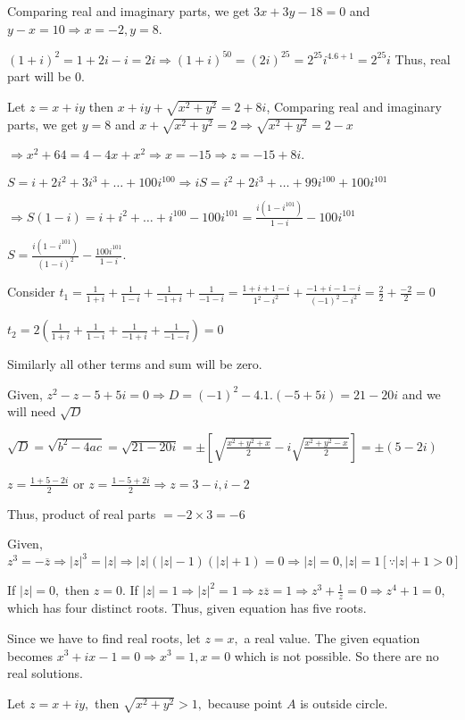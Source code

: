   Comparing real and imaginary parts, we get $3x + 3y - 18 = 0$ and $y - x = 10 \Rightarrow x = -2, y = 8$.
\item $(1 + i)^2 = 1 + 2i - i = 2i\Rightarrow (1 + i)^{50} = (2i)^{25} = 2^{25}i^{4.6 + 1} = 2^{25}i$ Thus,
  real part will be $0$.
\item Let $z = x + iy$ then $x + iy + \sqrt{x^2 + y^2} = 2 + 8i$, Comparing real and imaginary parts, we get
  $y = 8$ and $x + \sqrt{x^2 + y^2} = 2 \Rightarrow \sqrt{x^2 + y^2} = 2 - x$

  $\Rightarrow x^2 + 64 = 4 - 4x + x^2 \Rightarrow x = -15\Rightarrow z = -15 + 8i$.
\item $S = i + 2i^2 + 3i^3 +\ldots + 100i^{100}\Rightarrow iS = i^2 + 2i^3 + \ldots + 99i^{100} + 100i^{101}$

  $\Rightarrow S(1- i) = i + i^2 + \ldots + i^{100} - 100i^{101} = \frac{i(1 - i^{101})}{1 - i} - 100i^{101}$

  $S = \frac{i(1 - i^{101})}{(1- i)^2} - \frac{100i^{101}}{1 - i}$.
\item Consider $t_1 = \frac{1}{1 + i} + \frac{1}{1 - i} + \frac{1}{-1 + i} + \frac{1}{-1 - i} = \frac{1 + i
  + 1 - i}{1^2 - i^2} + \frac{-1 + i - 1 - i}{(-1)^2 - i^2} = \frac{2}{2} + \frac{-2}{2} = 0$

  $t_2 = 2\left(\frac{1}{1 + i} + \frac{1}{1 - i} + \frac{1}{-1 + i} + \frac{1}{-1 - i}\right) = 0$

  Similarly all other terms and sum will be zero.
\item Given, $z^2 - z - 5 + 5i = 0 \Rightarrow D = (-1)^2 - 4.1.(-5 + 5i) = 21 - 20i$ and we will need
  $\sqrt{D}$

  $\sqrt{D} = \sqrt{b^2 - 4ac} = \sqrt{21 - 20i} = \pm \left[\sqrt{\frac{x^2 + y^2 + x}{2}} -
  i\sqrt{\frac{x^2 + y^2 - x}{2}}\right] = \pm(5 - 2i)$

  $z = \frac{1 + 5 - 2i}{2}$ or $z = \frac{1 - 5 + 2i}{2}\Rightarrow z = 3 - i, i - 2$

  Thus, product of real parts $= -2\times 3 = -6$
\item Given, $z^3 = -\overline{z}\Rightarrow |z|^3 = |z|\Rightarrow |z|(|z| - 1)(|z| + 1) = 0 \Rightarrow
  |z| = 0, |z| = 1 [\because |z| + 1 > 0]$

  If $|z| = 0,$ then $z = 0.$ If $|z| = 1 \Rightarrow |z|^2 = 1\Rightarrow z\overline{z} = 1\Rightarrow z^3
  + \frac{1}{z} = 0 \Rightarrow z^4 + 1 = 0,$ which has four distinct roots. Thus, given equation has five
  roots.
\item Since we have to find real roots, let $z = x,$ a real value. The given equation becomes $x^3 + ix - 1=
  0\Rightarrow x^3 = 1, x = 0$ which is not possible. So there are no real solutions.
\item Let $z = x + iy,$ then $\sqrt{x^2 + y^2} > 1,$ because point $A$ is outside circle.

